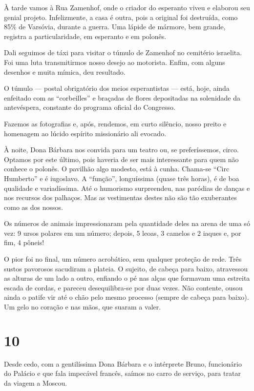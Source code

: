 À tarde vamos à Rua Zamenhof, onde o criador do esperanto viveu e elaborou seu genial projeto. Infelizmente, a casa é outra, pois a original foi destruída, como 85\% de Varsóvia, durante a guerra. Uma lápide de mármore, bem grande, registra a particularidade, em esperanto e em polonês.

Dali seguimos de táxi para visitar o túmulo de Zamenhof no cemitério israelita. Foi uma luta transmitirmos nosso desejo ao motorista. Enfim, com alguns desenhos e muita mímica, deu resultado.

O túmulo --- postal obrigatório dos meios esperantistas --- está, hoje, ainda enfeitado com as ``corbeilles'' e braçadas de flores depositadas na solenidade da antevéspera, constante do programa oficial do Congresso.

Fazemos as fotografias e, após, rendemos, em curto silêncio, nosso preito e homenagem ao lúcido espírito missionário ali evocado.

À noite, Dona Bárbara nos convida para um teatro ou, se preferíssemos, circo. Optamos por este último, pois haveria de ser mais interessante para quem não conhece o polonês. O pavilhão algo modesto, está à cunha. Chama-se ``Circ Humberto'' e é iugoslavo. A ``função'', longuíssima (quase três horas), é de boa qualidade e variadíssima. Até o humorismo surpreendeu, nas paródias de danças e nos recursos dos palhaços. Mas as vestimentas destes não são tão exuberantes como as dos nossos.

Os números de animais impressionaram pela quantidade deles na arena de uma só vez: 9 ursos polares em um número; depois, 5 leoas, 3 camelos e 2 iaques e, por fim, 4 pôneis!

O pior foi no final, um número acrobático, sem qualquer proteção de rede. Três sustos pavorosos sacudiram a plateia. O sujeito, de cabeça para baixo, atravessou as alturas de um lado a outro, enfiando o pé nas alças que formavam uma estreita escada de cordas, e pareceu desequilibra-se por duas vezes. Não contente, ousou ainda o patife vir até o chão pelo mesmo processo (sempre de cabeça para baixo). Um gelo no coração e nas mãos, que suaram a valer.

\section*{10 \adfflatleafright {}}
Desde cedo, com a gentilíssima Dona Bárbara e o intérprete Bruno, funcionário do Palácio e que fala impecável francês, saímos no carro de serviço, para tratar da viagem a Moscou.

